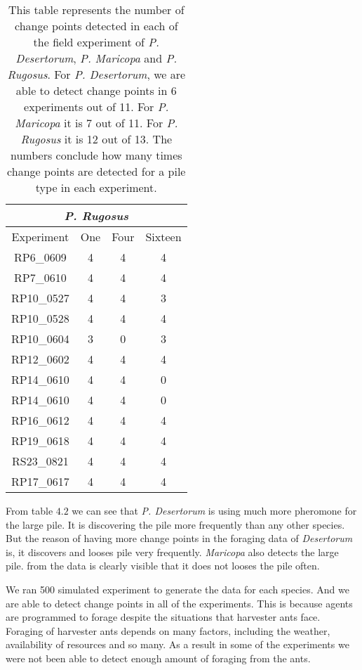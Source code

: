 \begin{table}[h]
\begin{center}
		\begin{tabular}{|c|c|c|c|}
			\hline
			\multicolumn{4}{|c|}{\textit{P. Rugosus}} \\ \hline
			Experiment & One & Four & Sixteen \\ \hline
			RP6\_0609 & 4 & 4 & 4 \\ \hline
			RP7\_0610 & 4 & 4 & 4 \\ \hline
			RP10\_0527 & 4 & 4 & 3 \\ \hline
			RP10\_0528 & 4 & 4 & 4  \\ \hline   
			RP10\_0604 & 3 & 0 & 3 \\ \hline
			RP12\_0602 & 4 & 4 & 4  \\ \hline
			RP14\_0610 & 4 & 4 & 0  \\ \hline  
			RP14\_0610 & 4 & 4 & 0  \\ \hline
			RP16\_0612 & 4 & 4 & 4  \\ \hline
			RP19\_0618 & 4 & 4 & 4  \\ \hline
			RS23\_0821 & 4 & 4 & 4  \\ \hline 
			RP17\_0617 & 4 & 4 & 4  \\ \hline 
		\end{tabular}
	\end{center}
	\caption{This table represents the number of change points detected in each of the field experiment of \textit{P. Desertorum}, \textit{P. Maricopa} and \textit{P. Rugosus}. For \textit{P. Desertorum}, we are able to detect change points in 6 experiments out of 11. For \textit{P. Maricopa} it is 7 out of 11. For \textit{P. Rugosus} it is 12 out of 13. The numbers conclude how many times change points are detected for a pile type in each experiment.}
\end{table}
From table $4.2$ we can see that \textit{P. Desertorum} is using much more pheromone for the large pile. It is discovering the pile more frequently than any other species. But the reason of having more change points in the foraging data of \textit{Desertorum} is, it discovers and looses pile very frequently. \textit{Maricopa} also detects the large pile. from the data is clearly visible that it does not looses the pile often. \par
 
We ran 500 simulated experiment to generate the data for each species. And we are able to detect change points in all of the experiments. This is because agents are programmed to forage despite the situations that harvester ants face. Foraging of harvester ants depends on many factors, including the weather, availability of resources and so many. As a result in some of the experiments we were not been able to detect enough amount of foraging from the ants. 